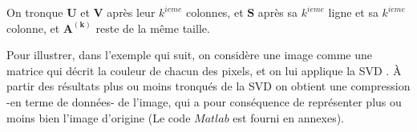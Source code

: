 \documentclass[12pt,a4paper]{report}
\begin{document}
On tronque $\mathbf{U}$ et $\mathbf{V}$ après leur $k^{ieme}$ colonnes, et $\mathbf{S}$ après sa $k^{ieme}$ ligne et sa $k^{ieme}$ colonne, et $\mathbf{A^{(k)}}$ reste de la même taille. 

Pour illustrer, dans l'exemple qui suit, on considère une image comme une matrice qui décrit la couleur de chacun des pixels, et on lui applique la SVD . À partir des résultats plus ou moins tronqués de la SVD on obtient une compression -en terme de données- de l'image, qui a pour conséquence de représenter plus ou moins bien l'image d'origine (Le code $Matlab$ est fourni en annexes).

\begin{figure}[!ht]
\centering
{}
\hspace{1cm}
\hspace{1cm}

\end{figure}
\end{document}
